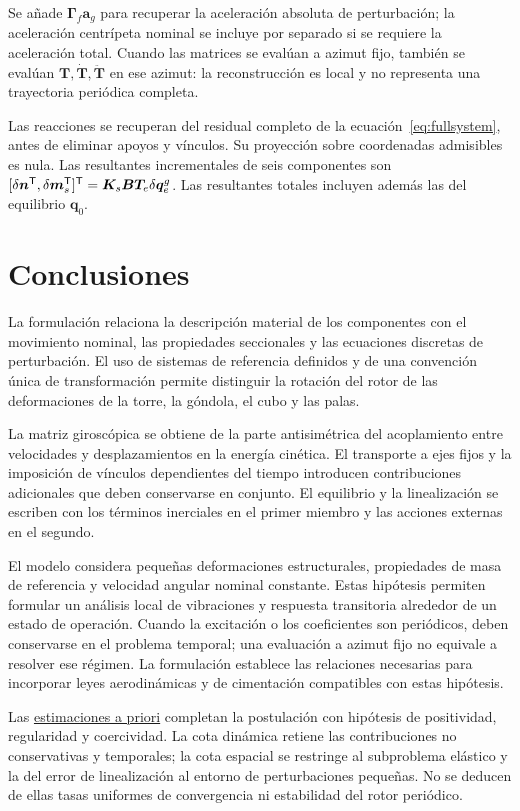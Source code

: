 Se añade $\bm\Gamma_f\bm a_g$ para recuperar la aceleración absoluta de perturbación; la aceleración centrípeta nominal se incluye por separado si se requiere la aceleración total. Cuando las matrices se evalúan a azimut fijo, también se evalúan $\bm T,\dot{\bm T},\ddot{\bm T}$ en ese azimut: la reconstrucción es local y no representa una trayectoria periódica completa.

Las reacciones se recuperan del residual completo de la ecuación~\eqref{eq:fullsystem}, antes de eliminar apoyos y vínculos. Su proyección sobre coordenadas admisibles es nula. Las resultantes incrementales de seis componentes son
$[\delta\bm n^\mathsf T,\delta\bm m_s^\mathsf T]^\mathsf T=\bm K_s\bm B\bm T_e\delta\bm q_e^g$.
Las resultantes totales incluyen además las del equilibrio $\bm q_0$.

\section{Conclusiones}
La formulación relaciona la descripción material de los componentes con el movimiento nominal, las propiedades seccionales y las ecuaciones discretas de perturbación. El uso de sistemas de referencia definidos y de una convención única de transformación permite distinguir la rotación del rotor de las deformaciones de la torre, la góndola, el cubo y las palas.

La matriz giroscópica se obtiene de la parte antisimétrica del acoplamiento entre velocidades y desplazamientos en la energía cinética. El transporte a ejes fijos y la imposición de vínculos dependientes del tiempo introducen contribuciones adicionales que deben conservarse en conjunto. El equilibrio y la linealización se escriben con los términos inerciales en el primer miembro y las acciones externas en el segundo.

El modelo considera pequeñas deformaciones estructurales, propiedades de masa de referencia y velocidad angular nominal constante. Estas hipótesis permiten formular un análisis local de vibraciones y respuesta transitoria alrededor de un estado de operación. Cuando la excitación o los coeficientes son periódicos, deben conservarse en el problema temporal; una evaluación a azimut fijo no equivale a resolver ese régimen. La formulación establece las relaciones necesarias para incorporar leyes aerodinámicas y de cimentación compatibles con estas hipótesis.

Las \hyperref[sec:apriori]{estimaciones a priori} completan la postulación con hipótesis de positividad, regularidad y coercividad. La cota dinámica retiene las contribuciones no conservativas y temporales; la cota espacial se restringe al subproblema elástico y la del error de linealización al entorno de perturbaciones pequeñas. No se deducen de ellas tasas uniformes de convergencia ni estabilidad del rotor periódico.

